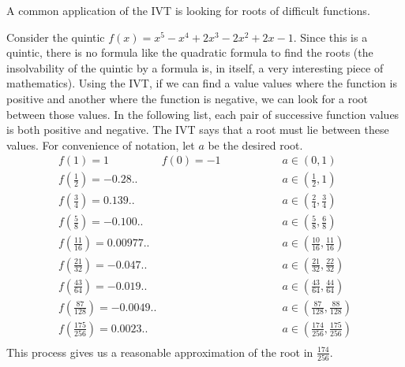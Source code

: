 \documentclass[fleqn]{report}
\begin{document}
A common application of the IVT is looking for roots of
difficult functions. 
\begin{example}
Consider the quintic 
$f(x) = x^5 - x^4 + 2x^3 - 2x^2 + 2x - 1$. 
Since this is a quintic, there is no formula like the
quadratic formula to find the roots (the insolvability of the
quintic by a formula is, in itself, a very interesting piece
of mathematics). Using the IVT, if we can find a value
values where the function is positive and another where the
function is negative, we can look for a root between those values. In
the following list, each pair of successive function values is
both positive and negative. The IVT says that a root must lie
between these values. For convenience of notation, let $a$ be
the desired root.
\begin{align*}
f(1) = 1 \hspace{2cm} f(0) = -1 & \hspace{2cm} a \in (0,1) \\
f\left(\frac{1}{2}\right) = -0.28.. & \hspace{2cm} a \in
\left(\frac{1}{2},1\right) \\
f\left(\frac{3}{4}\right) = 0.139.. & \hspace{2cm} a \in
\left(\frac{2}{4},\frac{3}{4}\right) \\
f\left(\frac{5}{8}\right) = -0.100.. & \hspace{2cm} a \in
\left(\frac{5}{8},\frac{6}{8}\right) \\
f\left(\frac{11}{16}\right) = 0.00977.. & \hspace{2cm} a \in
\left(\frac{10}{16},\frac{11}{16}\right) \\
f\left(\frac{21}{32}\right) = -0.047.. & \hspace{2cm} a \in
\left(\frac{21}{32},\frac{22}{32}\right) \\
f\left(\frac{43}{64}\right) = -0.019.. & \hspace{2cm} a \in
\left(\frac{43}{64},\frac{44}{64}\right) \\
f\left(\frac{87}{128}\right) = -0.0049.. & \hspace{2cm} a \in
\left(\frac{87}{128},\frac{88}{128}\right) \\
f\left(\frac{175}{256}\right) = 0.0023.. & \hspace{2cm} a \in
\left(\frac{174}{256},\frac{175}{256}\right) \\
\end{align*}
This process gives us a reasonable approximation of the root in
$\frac{174}{256}$.
\end{example}
\end{document}
